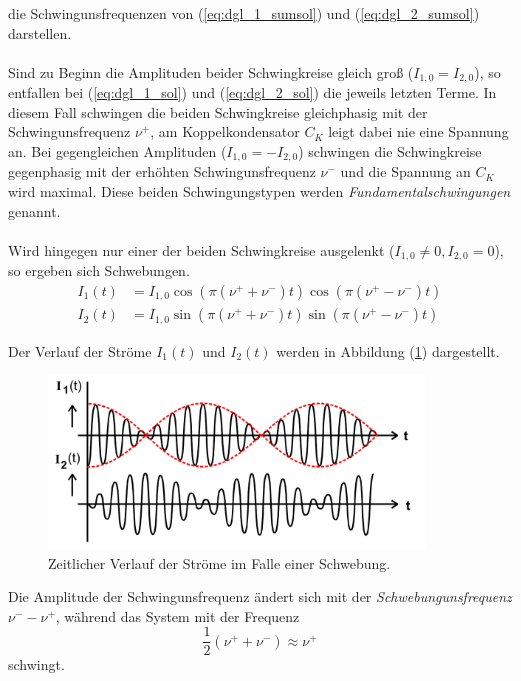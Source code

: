 die Schwingunsfrequenzen von (\ref{eq:dgl_1_sumsol}) und (\ref{eq:dgl_2_sumsol}) darstellen. \\
\\
Sind zu Beginn die Amplituden beider Schwingkreise gleich groß ($I_{1,0} = I_{2,0}$), so entfallen bei (\ref{eq:dgl_1_sol}) und (\ref{eq:dgl_2_sol})
die jeweils letzten Terme. In diesem Fall schwingen die beiden Schwingkreise gleichphasig mit der Schwingunsfrequenz $\nu^+$, am
Koppelkondensator $C_{K}$ leigt dabei nie eine Spannung an. Bei gegengleichen Amplituden ($I_{1,0} = -I_{2,0}$) schwingen die Schwingkreise gegenphasig
mit der erhöhten Schwingunsfrequenz $\nu^-$ und die Spannung an $C_{K}$ wird maximal. Diese beiden Schwingungstypen werden \textit{Fundamentalschwingungen} genannt. \\
\\
Wird hingegen nur einer der beiden Schwingkreise ausgelenkt ($I_{1,0} \neq 0, I_{2,0} = 0$), so ergeben sich Schwebungen.
\begin{align}
    I_{1}(t) &= I_{1,0} \cos(\pi (\nu^+ + \nu^-) t) \cos(\pi (\nu^+ - \nu^-) t) \label{eq:dgl_1_sol_schweb} \\
    I_{2}(t) &= I_{1,0} \sin(\pi (\nu^+ + \nu^-) t) \sin(\pi (\nu^+ - \nu^-) t) \label{eq:dgl_2_sol_schweb} 
\end{align}

Der Verlauf der Ströme $I_{1}(t)$ und $I_{2}(t)$ werden in Abbildung (\ref{fig:schwebung}) dargestellt.

\begin{figure} 
    \centering
    \includegraphics[width=10cm] {pictures/schwebung.png} 
    \caption{Zeitlicher Verlauf der Ströme im Falle einer Schwebung. \cite{v355}}
    \label{fig:schwebung}
\end{figure} 

Die Amplitude der Schwingunsfrequenz ändert sich mit der \textit{Schwebungunsfrequenz} $\nu^- - \nu^+$, während das System mit der Frequenz
\begin{equation}
    \frac{1}{2} \left( \nu^+ + \nu^- \right) \approx \nu^+ 
\end{equation}
schwingt.


